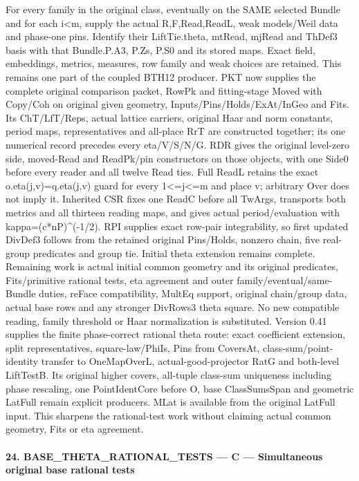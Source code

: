 For every family in the original class, eventually on the SAME selected Bundle and for each i<m, supply the actual R,F,Read,ReadL, weak models/Weil data and phase-one pins. Identify their LiftTie.theta, mtRead, mjRead and ThDef3 basis with that Bundle.P.A3, P.Zs, P.S0 and its stored maps. Exact field, embeddings, metrics, measures, row family and weak choices are retained. This remains one part of the coupled BTH12 producer. PKT now supplies the complete original comparison packet, RowPk and fitting-stage Moved with Copy/Coh on original given geometry, Inputs/Pins/Holds/ExAt/InGeo and Fits. Its ChT/LfT/Reps, actual lattice carriers, original Haar and norm constants, period maps, representatives and all-place RrT are constructed together; its one numerical record precedes every eta/V/S/N/G. RDR gives the original level-zero side, moved-Read and ReadPk/pin constructors on those objects, with one Side0 before every reader and all twelve Read ties. Full ReadL retains the exact o.eta(j,v)=q.eta(j,v) guard for every 1<=j<=m and place v; arbitrary Over does not imply it. Inherited CSR fixes one ReadC before all TwArgs, transports both metrics and all thirteen reading maps, and gives actual period/evaluation with kappa=(c*nP)\textasciicircum{}(-1/2). RPI supplies exact row-pair integrability, so first updated DivDef3 follows from the retained original Pins/Holds, nonzero chain, five real-group predicates and group tie. Initial theta extension remains complete. Remaining work is actual initial common geometry and its original predicates, Fits/primitive rational tests, eta agreement and outer family/eventual/same-Bundle duties, reFace compatibility, MultEq support, original chain/group data, actual base rows and any stronger DivRows3 theta square. No new compatible reading, family threshold or Haar normalization is substituted. Version 0.41 supplies the finite phase-correct rational theta route: exact coefficient extension, split representatives, square-law/PhiIs, Pins from CoversAt, class-sum/point-identity transfer to OneMapOverL, actual-good-projector RatG and both-level LiftTestB. Its original higher covers, all-tuple class-sum uniqueness including phase rescaling, one PointIdentCore before O, base ClassSumsSpan and geometric LatFull remain explicit producers. MLat is available from the original LatFull input. This sharpens the rational-test work without claiming actual common geometry, Fits or eta agreement.



\paragraph{24. BASE\_\allowbreak THETA\_\allowbreak RATIONAL\_\allowbreak TESTS — C — Simultaneous original base rational tests}

